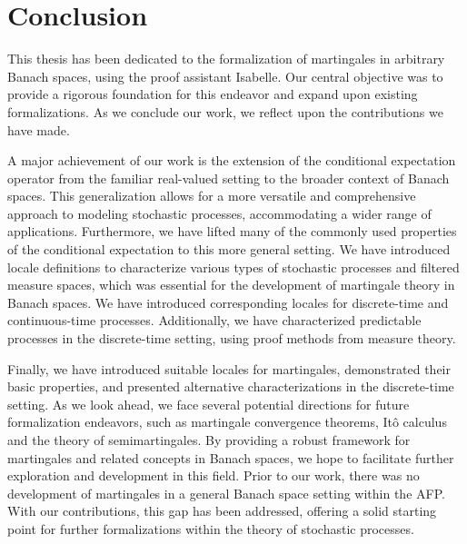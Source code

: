 
\chapter{Conclusion}\label{chapter:conclusion}

This thesis has been dedicated to the formalization of martingales in arbitrary Banach spaces, using the proof assistant Isabelle. Our central objective was to provide a rigorous foundation for this endeavor and expand upon existing formalizations. As we conclude our work, we reflect upon the contributions we have made.

A major achievement of our work is the extension of the conditional expectation operator from the familiar real-valued setting to the broader context of Banach spaces. This generalization allows for a more versatile and comprehensive approach to modeling stochastic processes, accommodating a wider range of applications. Furthermore, we have lifted many of the commonly used properties of the conditional expectation to this more general setting. We have introduced locale definitions to characterize various types of stochastic processes and filtered measure spaces, which was essential for the development of martingale theory in Banach spaces. We have introduced corresponding locales for discrete-time and continuous-time processes. Additionally, we have characterized predictable processes in the discrete-time setting, using proof methods from measure theory.

Finally, we have introduced suitable locales for martingales, demonstrated their basic properties, and presented alternative characterizations in the discrete-time setting. As we look ahead, we face several potential directions for future formalization endeavors, such as martingale convergence theorems, It\^o calculus and the theory of semimartingales. By providing a robust framework for martingales and related concepts in Banach spaces, we hope to facilitate further exploration and development in this field. Prior to our work, there was no development of martingales in a general Banach space setting within the \textsf{AFP}. With our contributions, this gap has been addressed, offering a solid starting point for further formalizations within the theory of stochastic processes.